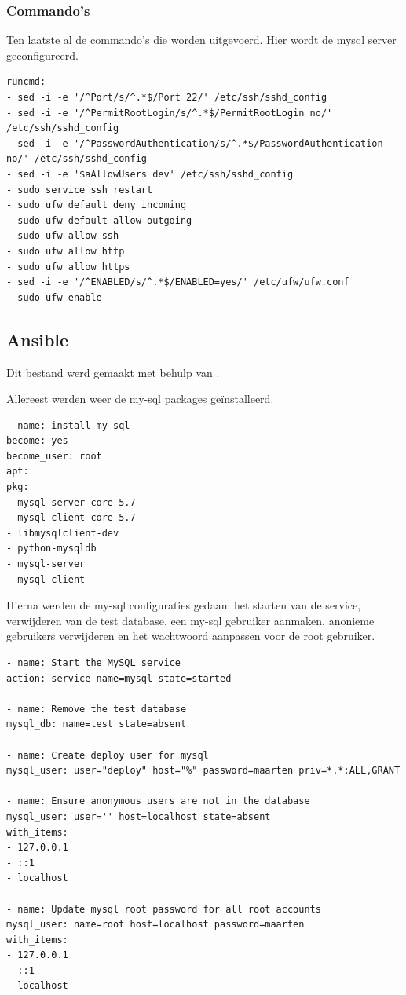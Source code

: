 \subsubsection{Commando's}
Ten laatste al de commando's die worden uitgevoerd. Hier wordt de mysql server geconfigureerd.
\begin{lstlisting}[basicstyle=\small]
runcmd:
- sed -i -e '/^Port/s/^.*$/Port 22/' /etc/ssh/sshd_config
- sed -i -e '/^PermitRootLogin/s/^.*$/PermitRootLogin no/' /etc/ssh/sshd_config
- sed -i -e '/^PasswordAuthentication/s/^.*$/PasswordAuthentication no/' /etc/ssh/sshd_config
- sed -i -e '$aAllowUsers dev' /etc/ssh/sshd_config
- sudo service ssh restart
- sudo ufw default deny incoming
- sudo ufw default allow outgoing
- sudo ufw allow ssh
- sudo ufw allow http
- sudo ufw allow https
- sed -i -e '/^ENABLED/s/^.*$/ENABLED=yes/' /etc/ufw/ufw.conf
- sudo ufw enable
\end{lstlisting}


\subsection{Ansible}
Dit bestand werd gemaakt met behulp van \autocite{hassin}.

Allereest werden weer de my-sql packages geïnstalleerd.
\begin{lstlisting}[basicstyle=\small]
- name: install my-sql
become: yes
become_user: root
apt:
pkg:
- mysql-server-core-5.7
- mysql-client-core-5.7
- libmysqlclient-dev
- python-mysqldb
- mysql-server
- mysql-client
\end{lstlisting}

Hierna werden de my-sql configuraties gedaan: het starten van de service, verwijderen van de test database, een my-sql gebruiker aanmaken, anonieme gebruikers verwijderen en het wachtwoord aanpassen voor de root gebruiker.
\begin{lstlisting}[basicstyle=\small]
- name: Start the MySQL service
action: service name=mysql state=started

- name: Remove the test database
mysql_db: name=test state=absent

- name: Create deploy user for mysql
mysql_user: user="deploy" host="%" password=maarten priv=*.*:ALL,GRANT

- name: Ensure anonymous users are not in the database
mysql_user: user='' host=localhost state=absent
with_items:
- 127.0.0.1
- ::1
- localhost

- name: Update mysql root password for all root accounts
mysql_user: name=root host=localhost password=maarten
with_items:
- 127.0.0.1
- ::1
- localhost
\end{lstlisting}


